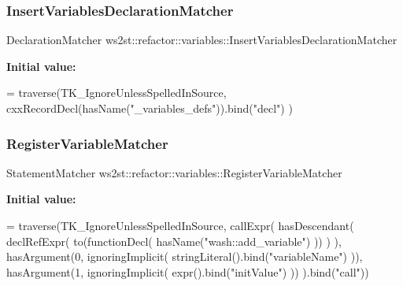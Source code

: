 \subsubsection{\texorpdfstring{Insert\+Variables\+Declaration\+Matcher}{InsertVariablesDeclarationMatcher}}
{\footnotesize\ttfamily Declaration\+Matcher ws2st\+::refactor\+::variables\+::\+Insert\+Variables\+Declaration\+Matcher}

{\bfseries Initial value\+:}
\begin{DoxyCode}
= traverse(TK\_IgnoreUnlessSpelledInSource, 
        cxxRecordDecl(hasName(\textcolor{stringliteral}{"\_variables\_defs"})).bind(\textcolor{stringliteral}{"decl"})
    )
\end{DoxyCode}
\mbox{\label{namespacews2st_1_1refactor_1_1variables_afd44f50cdfee36cffc078a0a476443ac}} 
\subsubsection{\texorpdfstring{Register\+Variable\+Matcher}{RegisterVariableMatcher}}
{\footnotesize\ttfamily Statement\+Matcher ws2st\+::refactor\+::variables\+::\+Register\+Variable\+Matcher}

{\bfseries Initial value\+:}
\begin{DoxyCode}
= traverse(TK\_IgnoreUnlessSpelledInSource, callExpr(
        hasDescendant(
            declRefExpr(
                to(functionDecl(
                    hasName(\textcolor{stringliteral}{"wash::add\_variable"})
                ))
            )
        ),
        hasArgument(0, ignoringImplicit( stringLiteral().bind(\textcolor{stringliteral}{"variableName"}) )),
        hasArgument(1, ignoringImplicit( expr().bind(\textcolor{stringliteral}{"initValue"}) ))
    ).bind(\textcolor{stringliteral}{"call"}))
\end{DoxyCode}
\mbox{\label{namespacews2st_1_1refactor_1_1variables_aa604808c747d1f1c063e9486b2938ed7}} 

